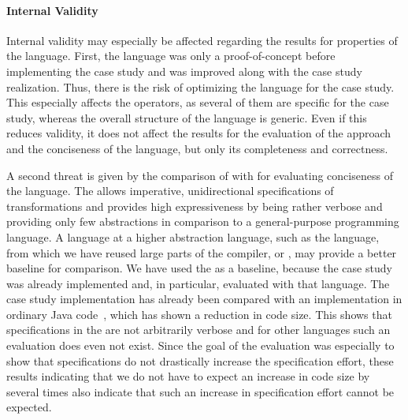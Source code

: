 

\paragraph{Internal Validity}
Internal validity may especially be affected regarding the results for properties of the \commonalities language.
First, the language was only a proof-of-concept before implementing the case study and was improved along with the case study realization.
Thus, there is the risk of optimizing the language for the case study.
This especially affects the operators, as several of them are specific for the case study, whereas the overall structure of the language is generic.
Even if this reduces validity, it does not affect the results for the evaluation of the \commonalities approach and the conciseness of the language, but only its completeness and correctness.

A second threat is given by the comparison of \commonalities with \reactions for evaluating conciseness of the language.
The \reactionslanguage allows imperative, unidirectional specifications of transformations and provides high expressiveness by being rather verbose and providing only few abstractions in comparison to a general-purpose programming language.
A language at a higher abstraction language, such as the \mappings language, from which we have reused large parts of the compiler, or \qvtr, may provide a better baseline for comparison.
We have used the \reactionslanguage as a baseline, because the case study was already implemented and, in particular, evaluated with that language.
The case study implementation has already been compared with an implementation in ordinary Java code~, which has shown a reduction in code size.
This shows that specifications in the \reactionslanguage are not arbitrarily verbose and for other languages such an evaluation does even not exist.
Since the goal of the evaluation was especially to show that \commonalities specifications do not drastically increase the specification effort, these results indicating that we do not have to expect an increase in code size by several times also indicate that such an increase in specification effort cannot be expected.

